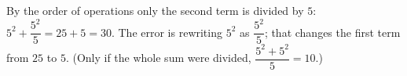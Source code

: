 By the order of operations only the second term is divided by $5$: $5^2+\dfrac{5^2}{5}=25+5=\boxed{30}$. The error is rewriting $5^2$ as $\dfrac{5^2}{5}$; that changes the first term from $25$ to $5$. (Only if the whole sum were divided, $\dfrac{5^2+5^2}{5}=10$.)
